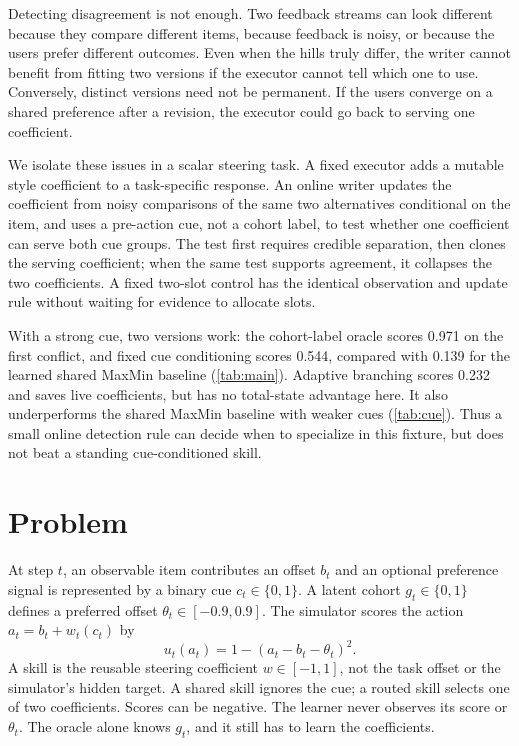 \documentclass[11pt]{article}
\begin{document}
Detecting disagreement is not enough. Two feedback streams can look different because they compare different items, because feedback is noisy, or because the users prefer different outcomes. Even when the hills truly differ, the writer cannot benefit from fitting two versions if the executor cannot tell which one to use. Conversely, distinct versions need not be permanent. If the users converge on a shared preference after a revision, the executor could go back to serving one coefficient.

We isolate these issues in a scalar steering task. A fixed executor adds a mutable style coefficient to a task-specific response. An online writer updates the coefficient from noisy comparisons of the same two alternatives conditional on the item, and uses a pre-action cue, not a cohort label, to test whether one coefficient can serve both cue groups. The test first requires credible separation, then clones the serving coefficient; when the same test supports agreement, it collapses the two coefficients. A fixed two-slot control has the identical observation and update rule without waiting for evidence to allocate slots.

With a strong cue, two versions work: the cohort-label oracle scores 0.971 on the first conflict, and fixed cue conditioning scores 0.544, compared with 0.139 for the learned shared MaxMin baseline (\cref{tab:main}). Adaptive branching scores 0.232 and saves live coefficients, but has no total-state advantage here. It also underperforms the shared MaxMin baseline with weaker cues (\cref{tab:cue}). Thus a small online detection rule can decide when to specialize in this fixture, but does not beat a standing cue-conditioned skill.

\section{Problem}
\label{sec:problem}
At step \(t\), an observable item contributes an offset \(b_t\) and an optional preference signal is represented by a binary cue \(c_t\in\{0,1\}\). A latent cohort \(g_t\in\{0,1\}\) defines a preferred offset \(\theta_t\in[-0.9,0.9]\). The simulator scores the action \(a_t=b_t+w_t(c_t)\) by
\begin{equation}
  u_t(a_t) = 1-(a_t-b_t-\theta_t)^2.
  \label{eq:utility}
\end{equation}
A skill is the reusable steering coefficient \(w\in[-1,1]\), not the task offset or the simulator's hidden target. A shared skill ignores the cue; a routed skill selects one of two coefficients. Scores can be negative. The learner never observes its score or \(\theta_t\). The oracle alone knows \(g_t\), and it still has to learn the coefficients.
\end{document}
